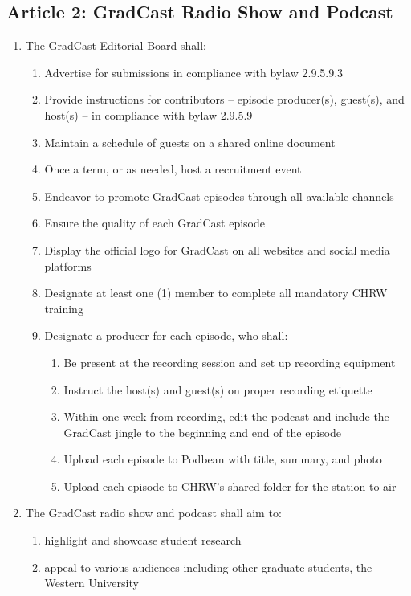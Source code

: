 \subsection{Article 2: GradCast Radio Show and Podcast}
\begin{enumerate} [label*=\arabic*., align=left]	
\item The GradCast Editorial Board shall:
\begin{enumerate}[label*=\arabic*., align=left]	
\item Advertise for submissions in compliance with bylaw 2.9.5.9.3
\item Provide instructions for contributors -- episode producer(s), guest(s), and host(s) -- in
compliance with bylaw 2.9.5.9
\item Maintain a schedule of guests on a shared online document
\item Once a term, or as needed, host a recruitment event
\item Endeavor to promote GradCast episodes through all available channels
\item Ensure the quality of each GradCast episode
\item Display the official logo for GradCast on all websites and social media platforms
\item Designate at least one (1) member to complete all mandatory CHRW training
\item Designate a producer for each episode, who shall:
\begin{enumerate}
\item Be present at the recording session and set up recording equipment
\item Instruct the host(s) and guest(s) on proper recording etiquette
\item Within one week from recording, edit the podcast and include the GradCast jingle to the beginning and end of the episode
\item Upload each episode to Podbean with title, summary, and photo
\item Upload each episode to CHRW's shared folder for the station to air
\end{enumerate}
\end{enumerate}
\item The GradCast radio show and podcast shall aim to:
\begin{enumerate}[label*=\arabic*., align=left]	
\item highlight and showcase student research
\item appeal to various audiences including other graduate students, the Western University

\end{enumerate}
\end{enumerate}
